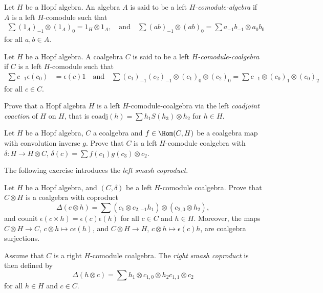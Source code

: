 \begin{definition}
Let $H$ be a Hopf algebra. An algebra $A$ is said to be a left
\emph{$H$-comodule-algebra} if $A$ is a left $H$-comodule such that 
\begin{align*}
\sum (1_A)_{-1}\otimes (1_A)_0 =1_{H}\otimes1_{A},
\quad\text{and}\quad 
\sum (ab)_{-1}\otimes (ab)_0 =\sum a_{-1}b_{-1}\otimes a_{0}b_{0}
\end{align*}
for all $a,b\in A$. 
\end{definition}


\begin{definition}
Let $H$ be a Hopf algebra. A coalgebra $C$ is said to be a left
\emph{$H$-comodule-coalgebra} if $C$ 
is a left $H$-comodule such that 
\begin{align*}
\sum c_{-1}\epsilon(c_{0}) & =\epsilon(c)1
\quad\text{and}\quad 
\sum (c_{1})_{-1}(c_{2})_{-1}\otimes(c_{1})_{0}\otimes(c_{2})_{0}  =\sum c_{-1}\otimes(c_{0})_{1}\otimes(c_{0})_{2}
\end{align*}
for all $c\in C$.
\end{definition}

\begin{exercise}
Prove that a Hopf algebra 
$H$ is a left $H$-comodule-coalgebra via the left \emph{coadjoint coaction}
of $H$ on $H$, that is $\mathrm{coadj}(h)=\sum h_{1}S(h_{3})\otimes h_{2}$ for $h\in H$. 
\end{exercise}

\begin{exercise}
Let $H$ be a Hopf algebra, $C$ a coalgebra and $f\in\Hom(C,H)$
be a coalgebra map with convolution inverse $g$. Prove that $C$ 
is a left $H$-comodule coalgebra with
$\delta\colon H\to H\otimes C$, 
$\delta(c)=\sum f(c_{1})g(c_{3})\otimes c_{2}$. 
\end{exercise}

The following exercise introduces the 
\emph{left smash coproduct}.

\begin{exercise}
\label{xca:smash_coleft}
Let $H$ be a Hopf algebra, and $(C,\delta)$ be a left $H$-comodule
coalgebra. Prove that $C\otimes H$ is a coalgebra with coproduct
\[
\Delta(c\otimes h)=\sum \left(c_{1}\otimes c_{2,-1}h_{1}\right)\otimes\left(c_{2,0}\otimes h_{2}\right),
\]
and counit $\epsilon(c\times h)=\epsilon(c)\epsilon(h)$ for
all $c\in C$ and $h\in H$.  Moreover, the maps $C\otimes H\to C$,
$c\otimes h\mapsto c\epsilon(h)$, and $C\otimes H\to H$, $c\otimes h\mapsto
\epsilon(c)h$, are coalgebra surjections.
\end{exercise}

Assume that $C$ is a right $H$-comodule coalgebra. The \emph{right
smash coproduct} is then defined by 
\[
\Delta(h\otimes c)=\sum h_{1}\otimes c_{1,0}\otimes h_{2}c_{1,1}\otimes c_{2}
\]
for all $h\in H$ and $c\in C$.




